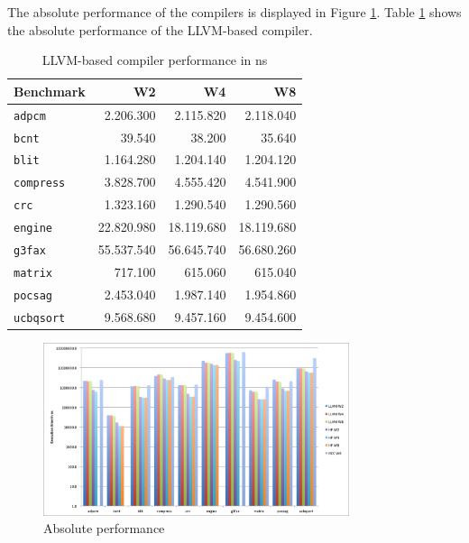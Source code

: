 The absolute performance of the compilers is displayed in Figure \ref{fig:abs_perf}. Table \ref{tbl:LLVM_perf} shows the absolute performance of the LLVM-based compiler. 

\begin{table}
  \centering
    \begin{tabular}{|l|r|r|r|}
    \hline
    \textbf{Benchmark} & \multicolumn{1}{|r|}{\textbf{W2}} & \multicolumn{1}{|r|}{\textbf{W4}}  & \multicolumn{1}{|r|}{\textbf{W8}} \\ \hline
	\texttt{adpcm} 		&  2.206.300	&  2.115.820 	&  2.118.040 	\\ \hline
	\texttt{bcnt} 		&  39.540		&  38.200 		&  35.640 		\\ \hline
	\texttt{blit} 		&  1.164.280	&  1.204.140 	&  1.204.120 	\\ \hline
	\texttt{compress} 	&  3.828.700	&  4.555.420 	&  4.541.900 	\\ \hline
	\texttt{crc} 		&  1.323.160	&  1.290.540 	&  1.290.560 	\\ \hline
	\texttt{engine} 	&  22.820.980	&  18.119.680 	&  18.119.680 	\\ \hline
	\texttt{g3fax} 		&  55.537.540	&  56.645.740 	&  56.680.260 	\\ \hline
	\texttt{matrix} 	&  717.100		&  615.060 		&  615.040 		\\ \hline
	\texttt{pocsag} 	&  2.453.040	&  1.987.140 	&  1.954.860 	\\ \hline
	\texttt{ucbqsort} 	&  9.568.680	&  9.457.160 	&  9.454.600 	\\ \hline
    \end{tabular}
  \caption{LLVM-based compiler performance in ns}
  \label{tbl:LLVM_perf}
\end{table}

\begin{figure}[ht]
\centering
\includegraphics[width=0.8\textwidth]{5_results/img/abs_perf.png}
\caption{Absolute performance}
\label{fig:abs_perf}
\end{figure}

